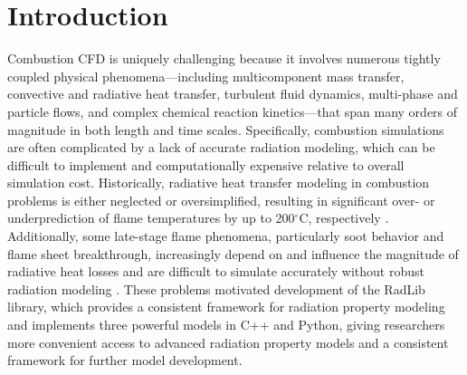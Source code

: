 \documentclass[preprint,12pt]{elsarticle}
\begin{document}

\section{Introduction} \label{s:motivation}

Combustion CFD is uniquely challenging because it involves numerous tightly coupled physical phenomena---including multicomponent mass transfer, convective and radiative heat transfer, turbulent fluid dynamics, multi-phase and particle flows, and complex chemical reaction kinetics---that span many orders of magnitude in both length and time scales. Specifically, combustion simulations are often complicated by a lack of accurate radiation modeling, which can be difficult to implement and computationally expensive relative to overall simulation cost. Historically, radiative heat transfer modeling in combustion problems is either neglected or oversimplified, resulting in significant over- or underprediction of flame temperatures by up to 200$^{\circ}$C, respectively \citep{Modest_2016}. Additionally, some late-stage flame phenomena, particularly soot behavior and flame sheet breakthrough, increasingly depend on and influence the magnitude of radiative heat losses and are difficult to simulate accurately without robust radiation modeling \cite{Modest_2013}. These problems motivated development of the RadLib library, which provides a consistent framework for radiation property modeling and implements three powerful models in C++ and Python, giving researchers more convenient access to advanced radiation property models and a consistent framework for further model development. 
%
\end{document}
